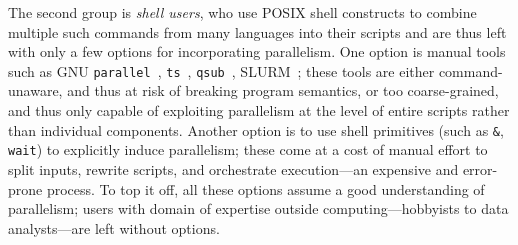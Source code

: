 \documentclass[sigplan, review, screen, anonymous]{acmart}
\newcommand{\ttt}[1]{\texttt{#1}}
\newcommand{\nv}[1]{[{\color{cyan}nv: #1}]}
\newcommand{\kk}[1]{[{\color{magenta}kk: #1}]}
\newcommand{\unix}{{\scshape Unix}\xspace}
\begin{document}
The second group is \emph{shell users}, who use POSIX shell constructs to combine multiple such commands from many languages into their scripts and are thus left with only a few options for incorporating parallelism.
One option is manual tools such as GNU \ttt{parallel}~\cite{Tange2011a}, \ttt{ts}~\cite{tsp}, \ttt{qsub}~\cite{gentzsch2001sun}, \textsc{SLURM}~\cite{yoo2003slurm};
  these tools are either command-unaware, and thus at risk of breaking program semantics, or too coarse-grained, and thus only capable of exploiting parallelism at the level of entire scripts rather than individual components.
Another option is to use shell primitives (such as \ttt{&}, \ttt{wait}) to explicitly induce parallelism;
 these come at a cost of manual effort to split inputs, rewrite scripts, and orchestrate execution---an expensive and error-prone process.
To top it off, all these options assume a good understanding of parallelism;
  users with domain of expertise outside computing---hobbyists to data analysts---are left without options.
\end{document}
